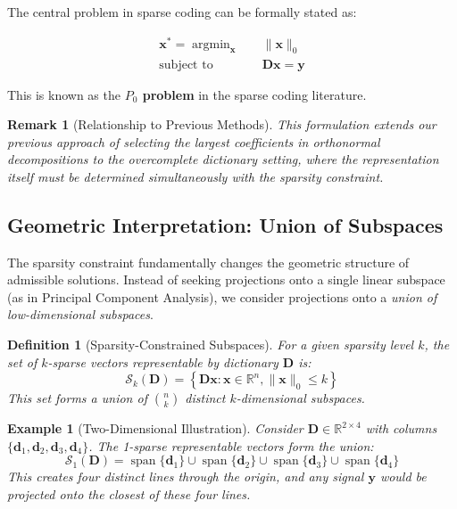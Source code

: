 \documentclass[12pt]{article}
\DeclareMathOperator{\argmin}{argmin}
\DeclareMathOperator{\spn}{span}
\newtheorem{definition}[theorem]{Definition}
\newtheorem{example}[theorem]{Example}
\newtheorem{remark}[theorem]{Remark}
\begin{document}
The central problem in sparse coding can be formally stated as:

\begin{equation}\label{eq:sparse_coding_main}
    \boxed{
        \begin{aligned}
            \mathbf{x}^* = \argmin_{\mathbf{x}} \quad & \|\mathbf{x}\|_0                  \\
            \text{subject to} \quad                   & \mathbf{D}\mathbf{x} = \mathbf{y}
        \end{aligned}
    }
\end{equation}

This is known as the \textbf{$P_0$ problem} in the sparse coding literature.

\begin{remark}[Relationship to Previous Methods]
    This formulation extends our previous approach of selecting the largest coefficients in orthonormal decompositions to the overcomplete dictionary setting, where the representation itself must be determined simultaneously with the sparsity constraint.
\end{remark}

\subsection{Geometric Interpretation: Union of Subspaces}

The sparsity constraint fundamentally changes the geometric structure of admissible solutions. Instead of seeking projections onto a single linear subspace (as in Principal Component Analysis), we consider projections onto a \textit{union of low-dimensional subspaces}.

\begin{definition}[Sparsity-Constrained Subspaces]\label{def:sparse_subspaces}
    For a given sparsity level $k$, the set of $k$-sparse vectors representable by dictionary $\mathbf{D}$ is:
    \begin{equation}
        \mathcal{S}_k(\mathbf{D}) = \left\{\mathbf{D}\mathbf{x} : \mathbf{x} \in \mathbb{R}^n, \|\mathbf{x}\|_0 \leq k\right\}
    \end{equation}
    This set forms a union of $\binom{n}{k}$ distinct $k$-dimensional subspaces.
\end{definition}

\begin{example}[Two-Dimensional Illustration]\label{ex:2d_sparse_subspaces}
    Consider $\mathbf{D} \in \mathbb{R}^{2 \times 4}$ with columns $\{\mathbf{d}_1, \mathbf{d}_2, \mathbf{d}_3, \mathbf{d}_4\}$. The 1-sparse representable vectors form the union:
    \begin{equation}
        \mathcal{S}_1(\mathbf{D}) = \spn\{\mathbf{d}_1\} \cup \spn\{\mathbf{d}_2\} \cup \spn\{\mathbf{d}_3\} \cup \spn\{\mathbf{d}_4\}
    \end{equation}
    This creates four distinct lines through the origin, and any signal $\mathbf{y}$ would be projected onto the closest of these four lines.
\end{example}
\end{document}
